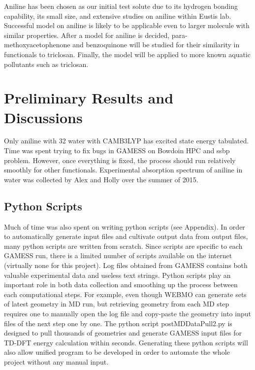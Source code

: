 \documentclass[
journal=jpcbfk, %
manuscript=article]{achemso}
\begin{document}
Aniline has been chosen as our initial test solute due to its hydrogen bonding capability, its small size, and extensive studies on aniline within Eustis lab. Successful model on aniline is likely to be applicable even to larger molecule with similar properties. After a model for aniline is decided, para-methoxyacetophenone and benzoquinone will be studied for their similarity in functionals to triclosan. Finally, the model will be applied to more known aquatic pollutants such as triclosan.
\clearpage

\section{Preliminary Results and Discussions}

Only aniline with 32 water with CAMB3LYP has excited state energy tabulated. Time was spent trying to fix bugs in GAMESS on Bowdoin HPC and ssbp problem. However, once everything is fixed, the process should run relatively smoothly for other functionals. Experimental absorption spectrum of aniline in water was collected by Alex and Holly over the summer of 2015. 

\subsection{Python Scripts}
Much of time was also spent on writing python scripts (see Appendix). In order to automatically generate input files and cultivate output data from output files, many python scripts are written from scratch. Since scripts are specific to each GAMESS run, there is a limited number of scripts available on the internet (virtually none for this project). Log files obtained from GAMESS contains both valuable experimental data and useless text strings. Python scripts play an important role in both data collection and smoothing up the process between each computational steps.  For example, even though WEBMO can generate sets of latest geometry in MD run, but retrieving geometry from each MD step requires one to manually open the log file and copy-paste the geometry into input files of the next step one by one. The python script postMDDataPull2.py is designed to pull thousands of geometries and generate GAMESS input files for TD-DFT energy calculation within seconds. Generating these python scripts will also allow unified program to be developed in order to automate the whole project without any manual input.
\end{document}
